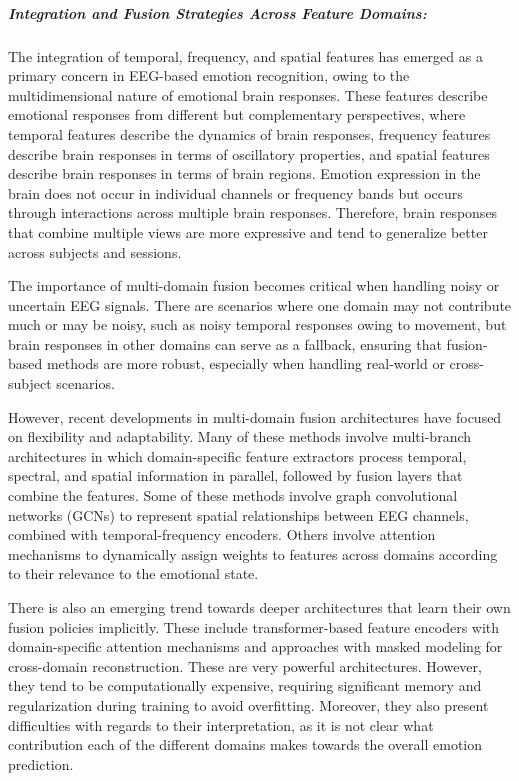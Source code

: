\documentclass{WileyMSP-template}
\begin{document}
\subparagraph{Integration and Fusion Strategies Across Feature Domains:}
The integration of temporal, frequency, and spatial features has emerged as a primary concern in EEG-based emotion recognition, owing to the multidimensional nature of emotional brain responses. These features describe emotional responses from different but complementary perspectives, where temporal features describe the dynamics of brain responses, frequency features describe brain responses in terms of oscillatory properties, and spatial features describe brain responses in terms of brain regions. Emotion expression in the brain does not occur in individual channels or frequency bands but occurs through interactions across multiple brain responses. Therefore, brain responses that combine multiple views are more expressive and tend to generalize better across subjects and sessions.

The importance of multi-domain fusion becomes critical when handling noisy or uncertain EEG signals. There are scenarios where one domain may not contribute much or may be noisy, such as noisy temporal responses owing to movement, but brain responses in other domains can serve as a fallback, ensuring that fusion-based methods are more robust, especially when handling real-world or cross-subject scenarios.

However, recent developments in multi-domain fusion architectures have focused on flexibility and adaptability. Many of these methods involve multi-branch architectures in which domain-specific feature extractors process temporal, spectral, and spatial information in parallel, followed by fusion layers that combine the features. Some of these methods involve graph convolutional networks (GCNs) to represent spatial relationships between EEG channels, combined with temporal-frequency encoders. Others involve attention mechanisms to dynamically assign weights to features across domains according to their relevance to the emotional state.

There is also an emerging trend towards deeper architectures that learn their own fusion policies implicitly. These include transformer-based feature encoders with domain-specific attention mechanisms and approaches with masked modeling for cross-domain reconstruction. These are very powerful architectures. However, they tend to be computationally expensive, requiring significant memory and regularization during training to avoid overfitting. Moreover, they also present difficulties with regards to their interpretation, as it is not clear what contribution each of the different domains makes towards the overall emotion prediction.
\end{document}
